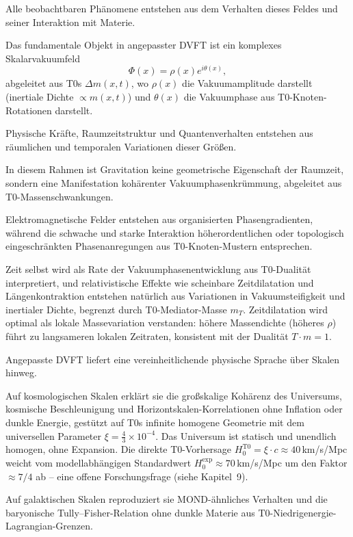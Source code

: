 	Alle beobachtbaren Phänomene entstehen aus dem Verhalten dieses Feldes und seiner Interaktion mit Materie.
	
	Das fundamentale Objekt in angepasster DVFT ist ein komplexes Skalarvakuumfeld
	\[
	\Phi(x)=\rho(x)e^{i\theta(x)},
	\]
	abgeleitet aus T0s $\Delta m(x,t)$, wo $\rho(x)$ die Vakuumamplitude darstellt (inertiale Dichte $\propto m(x,t)$) und $\theta(x)$
	die Vakuumphase aus T0-Knoten-Rotationen darstellt.
	
	Physische Kräfte, Raumzeitstruktur und Quantenverhalten entstehen aus räumlichen und temporalen Variationen dieser Größen.
	
	In diesem Rahmen ist Gravitation keine geometrische Eigenschaft der Raumzeit, sondern eine Manifestation kohärenter Vakuumphasenkrümmung, abgeleitet aus T0-Massenschwankungen.
	
	Elektromagnetische Felder entstehen aus organisierten Phasengradienten, während die schwache und starke Interaktion höherordentlichen oder topologisch eingeschränkten Phasenanregungen aus T0-Knoten-Mustern entsprechen.
	
	Zeit selbst wird als Rate der Vakuumphasenentwicklung aus T0-Dualität interpretiert, und relativistische Effekte wie scheinbare Zeitdilatation und Längenkontraktion entstehen natürlich aus Variationen in Vakuumsteifigkeit und inertialer Dichte, begrenzt durch T0-Mediator-Masse $m_T$. Zeitdilatation wird optimal als lokale Massevariation verstanden: höhere Massendichte (höheres $\rho$) führt zu langsameren lokalen Zeitraten, konsistent mit der Dualität $T \cdot m = 1$.
	
	Angepasste DVFT liefert eine vereinheitlichende physische Sprache über Skalen hinweg.
	
	Auf kosmologischen Skalen erklärt sie die großskalige Kohärenz des Universums, kosmische Beschleunigung und Horizontskalen-Korrelationen ohne Inflation oder dunkle Energie, gestützt auf T0s infinite homogene Geometrie mit dem universellen Parameter $\xi = \frac{4}{3} \times 10^{-4}$. Das Universum ist statisch und unendlich homogen, ohne Expansion. Die direkte T0-Vorhersage $H_0^{\text{T0}} = \xi \cdot c \approx 40\,$km/s/Mpc weicht vom modellabhängigen Standardwert $H_0^{\text{exp}} \approx 70\,$km/s/Mpc um den Faktor $\approx 7/4$ ab -- eine offene Forschungsfrage (siehe Kapitel~9).
	
	Auf galaktischen Skalen reproduziert sie MOND-ähnliches Verhalten und die baryonische Tully–Fisher-Relation ohne dunkle Materie aus T0-Niedrigenergie-Lagrangian-Grenzen.
	
